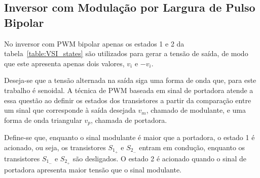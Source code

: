 \documentclass[
	12pt,				%
	openright,			%
	twoside,			%
	a4paper,			%
	english,			%
	french,				%
	spanish,			%
	brazil,				%
	]{abntex2}
\begin{document}
\subsection{Inversor com Modulação por Largura de Pulso Bipolar}

No inversor com PWM bipolar apenas os estados 1 e 2 da tabela~\ref{table:VSI_states} são utilizados para gerar a tensão de saída, de modo que este apresenta apenas dois valores, $v_i$ e $-v_i$.

Deseja-se que a tensão alternada na saída siga uma forma de onda que, para este trabalho é senoidal. A técnica de PWM baseada em sinal de portadora atende a essa questão ao definir os estados dos transistores a partir da comparação entre um sinal que corresponde à saída desejada $v_m$, chamado de modulante, e uma forma de onda triangular $v_p$, chamada de portadora.

Define-se que, enquanto o sinal modulante é maior que a portadora, o estado 1 é acionado, ou seja, os transistores $S_{1_+}$ e $S_{2_-}$ entram em condução, enquanto os transistores $S_{1_-}$ e $S_{2_+}$ são desligados. O estado 2 é acionado quando o sinal de portadora apresenta maior tensão que o sinal modulante. 
\end{document}
